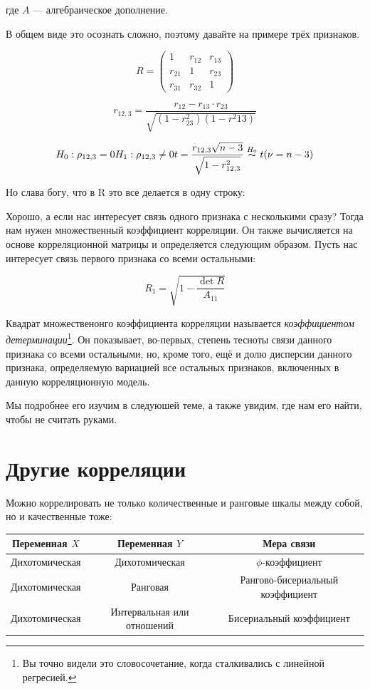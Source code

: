 \documentclass[
  letterpaper,
  DIV=11,
  numbers=noendperiod]{scrreprt}
\theoremstyle{definition}
\theoremstyle{remark}
\begin{document}
где \(A\) --- алгебраическое дополнение.

В общем виде это осознать сложно, поэтому давайте на примере трёх
признаков.

\[
R =
\begin{pmatrix}
1 & r_{12} & r_{13} \\
r_{21} & 1 & r_{23} \\
r_{31} & r_{32} & 1
\end{pmatrix}
\]

\[
r_{12,3} = \frac{r_{12} - r_{13} \cdot r_{23}}{\sqrt{(1 - r^2_{23})(1-r^2{13})}}
\]

\[
H_0: \rho_{12,3} = 0 \\
H_1: \rho_{12,3} \neq 0 \\
t = \frac{r_{12,3} \sqrt{n-3}}{\sqrt{1 - r^2_{12,3}}} \overset{H_0}{\thicksim} t(\nu = n-3)
\]

Но слава богу, что в R это все делается в одну строку:

Хорошо, а если нас интересует связь одного признака с несколькими сразу?
Тогда нам нужен множественный коэффициент корреляции. Он также
вычисляется на основе корреляционной матрицы и определяется следующим
образом. Пусть нас интересует связь первого признака со всеми
остальными:

\[
R_1 = \sqrt{1 - \frac{\det R}{A_{11}}}
\]

Квадрат множественонго коэффициента корреляции называется
\emph{коэффициентом детерминации}\footnote{Вы точно видели это
  словосочетание, когда сталкивались с линейной регресией.}. Он
показывает, во-первых, степень тесноты связи данного признака со всеми
остальными, но, кроме того, ещё и долю дисперсии данного признака,
определяемую вариацией все остальных признаков, включенных в данную
корреляционную модель.

Мы подробнее его изучим в следуюшей теме, а также увидим, где нам его
найти, чтобы не считать руками.

\section{Другие
корреляции}\label{ux434ux440ux443ux433ux438ux435-ux43aux43eux440ux440ux435ux43bux44fux446ux438ux438}

Можно коррелировать не только количественные и ранговые шкалы между
собой, но и качественные тоже:

\begin{longtable}[]{@{}ccc@{}}
\toprule\noalign{}
Переменная \(X\) & Переменная \(Y\) & Мера связи \\
\midrule\noalign{}
\endhead
\bottomrule\noalign{}
\endlastfoot
Дихотомическая & Дихотомическая & \(\phi\)-коэффициент \\
Дихотомическая & Ранговая & Рангово-бисериальный коэффициент \\
Дихотомическая & Интервальная или отношений & Бисериальный
коэффициент \\
\end{longtable}
\end{document}

